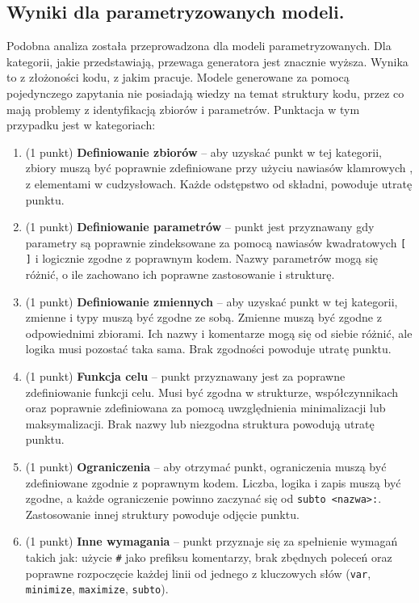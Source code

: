 \subsection{Wyniki dla parametryzowanych modeli.}

Podobna analiza została przeprowadzona dla modeli parametryzowanych. Dla kategorii, jakie przedstawiają, przewaga generatora jest znacznie wyższa. Wynika to z złożoności kodu, z jakim pracuje. Modele generowane za pomocą pojedynczego zapytania nie posiadają wiedzy na temat struktury kodu, przez co mają problemy z identyfikacją zbiorów i parametrów. Punktacja w tym przypadku jest w kategoriach:

\begin{enumerate}
\item (1 punkt) \textbf{Definiowanie zbiorów} -- aby uzyskać punkt w tej kategorii, zbiory muszą być poprawnie zdefiniowane przy użyciu nawiasów klamrowych \texttt{{}}, z elementami w cudzysłowach. Każde odstępstwo od składni, powoduje utratę punktu.
\item (1 punkt) \textbf{Definiowanie parametrów} -- punkt jest przyznawany gdy parametry są poprawnie zindeksowane za pomocą nawiasów kwadratowych \texttt{[ ]} i logicznie zgodne z poprawnym kodem. Nazwy parametrów mogą się różnić, o ile zachowano ich poprawne zastosowanie i strukturę.
\item (1 punkt) \textbf{Definiowanie zmiennych} -- aby uzyskać punkt w tej kategorii, zmienne i typy muszą być zgodne ze sobą. Zmienne muszą być zgodne z odpowiednimi zbiorami. Ich nazwy i komentarze mogą się od siebie różnić, ale logika musi pozostać taka sama. Brak zgodności powoduje utratę punktu.
\item (1 punkt) \textbf{Funkcja celu} -- punkt przyznawany jest za poprawne zdefiniowanie funkcji celu. Musi być zgodna w strukturze, współczynnikach oraz poprawnie zdefiniowana za pomocą uwzględnienia minimalizacji lub maksymalizacji. Brak nazwy lub niezgodna struktura powodują utratę punktu.
\item (1 punkt) \textbf{Ograniczenia} -- aby otrzymać punkt, ograniczenia muszą być zdefiniowane zgodnie z poprawnym kodem. Liczba, logika i zapis muszą być zgodne, a każde ograniczenie powinno zaczynać się od \texttt{subto <nazwa>:}. Zastosowanie innej struktury powoduje odjęcie punktu.
\item (1 punkt) \textbf{Inne wymagania} -- punkt przyznaje się za spełnienie wymagań takich jak: użycie \texttt{\#} jako prefiksu komentarzy, brak zbędnych poleceń oraz poprawne rozpoczęcie każdej linii od jednego z kluczowych słów (\texttt{var}, \texttt{minimize}, \texttt{maximize}, \texttt{subto}).
\end{enumerate}

